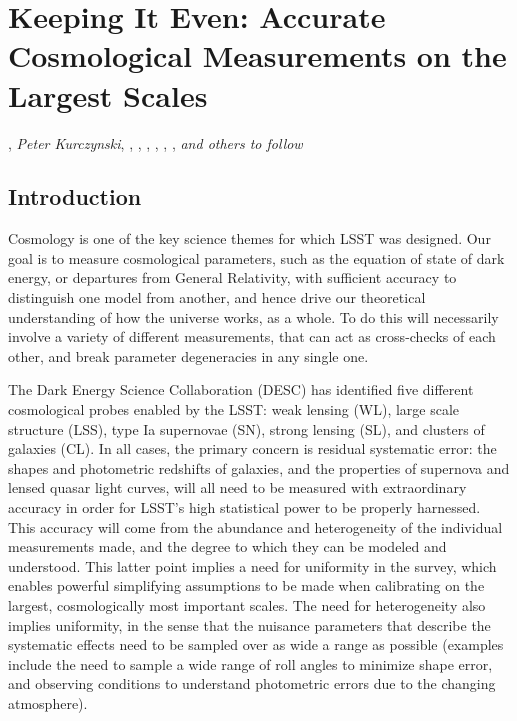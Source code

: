 
\chapter[Cosmology]{Keeping It Even: Accurate Cosmological Measurements on the Largest Scales}
\def\chpname{cosmo}\label{chp:\chpname}

,
{\it Peter Kurczynski},
,
,
,
,
,
,
{\it and others to follow}


\section{Introduction}
\label{sec:\chpname:intro}


Cosmology is one of the key science themes for which LSST was
designed. Our goal is to measure cosmological parameters, such as the
equation of state of dark energy, or departures from General
Relativity, with sufficient accuracy to distinguish one model from
another, and hence drive our theoretical understanding of how the
universe works, as a whole. To do this will necessarily involve a
variety of different measurements, that can act as cross-checks of
each other, and break parameter degeneracies in any single one.

The  Dark Energy Science Collaboration (DESC) has identified five
different cosmological probes enabled by the LSST: weak lensing (WL),
large scale structure (LSS), type Ia supernovae (SN), strong lensing
(SL), and clusters of galaxies (CL). In all cases, the primary concern
is residual systematic error: the shapes and photometric redshifts of
galaxies, and the properties of supernova and lensed quasar light
curves, will all need to be measured with extraordinary accuracy in order for LSST's high statistical power to be properly harnessed. This accuracy will come from the abundance and heterogeneity of the individual measurements made, and the degree to which they can be modeled and understood. This latter point implies a need for uniformity in the survey, which enables powerful simplifying assumptions to be made when calibrating on the largest, cosmologically most important scales. The need for heterogeneity also implies  uniformity, in the sense that the nuisance parameters that describe the systematic effects need to be sampled over as wide a range as possible (examples include the need to sample a wide range of roll angles to minimize shape error, and observing conditions to understand photometric errors due to the changing atmosphere).

